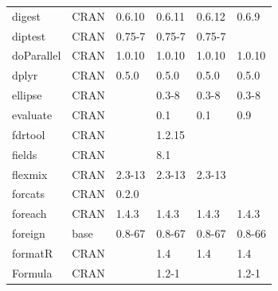 \begin{longtable}{llllll}
\rowcolor{black!5}
digest                        & CRAN                      & 0.6.10      & 0.6.11      & 0.6.12         & 0.6.9              \\
\rowcolor{black!10}
diptest                       & CRAN                      & 0.75-7      & 0.75-7      & 0.75-7         &                   \\
\rowcolor{black!5}
doParallel                    & CRAN                      & 1.0.10      & 1.0.10      & 1.0.10         & 1.0.10             \\
\rowcolor{black!10}
dplyr                         & CRAN                      & 0.5.0       & 0.5.0       & 0.5.0          & 0.5.0             \\
\rowcolor{black!5}
ellipse                       & CRAN                      &             & 0.3-8       & 0.3-8          & 0.3-8              \\
\rowcolor{black!10}
evaluate                      & CRAN                      &             & 0.1         & 0.1            & 0.9               \\
\rowcolor{black!5}
fdrtool                       & CRAN                      &             & 1.2.15      &                &                    \\
\rowcolor{black!10}
fields                        & CRAN                      &             & 8.1         &                &                   \\
\rowcolor{black!5}
flexmix                       & CRAN                      & 2.3-13      & 2.3-13      & 2.3-13         &                    \\
\rowcolor{black!10}
forcats                       & CRAN                      & 0.2.0       &             &                &                   \\
\rowcolor{black!5}
foreach                       & CRAN                      & 1.4.3       & 1.4.3       & 1.4.3          & 1.4.3              \\
\rowcolor{black!10}
foreign                       & base                      & 0.8-67      & 0.8-67      & 0.8-67         & 0.8-66            \\
\rowcolor{black!5}
formatR                       & CRAN                      &             & 1.4         & 1.4            & 1.4                \\
\rowcolor{black!10}
Formula                       & CRAN                      &             & 1.2-1       &                & 1.2-1             \\

\end{longtable}
